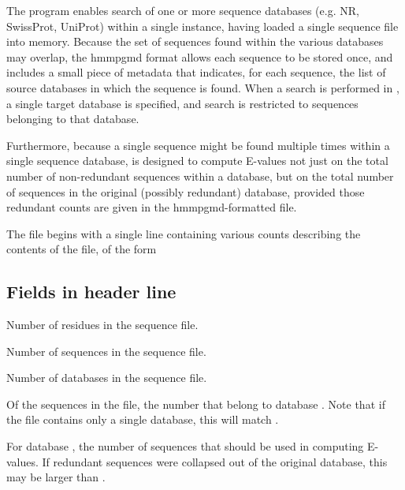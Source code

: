 The  program enables search of one or more sequence 
databases (e.g. NR, SwissProt, UniProt) within a single instance,
having loaded a single sequence file into memory. Because the set of 
sequences found within the various databases may overlap, the hmmpgmd 
format allows each sequence to be stored once, and includes a small piece of
metadata that indicates, for each sequence, the list of source databases in
which the sequence is found. When a search is performed in , a
single target database is specified, and search is restricted to sequences
belonging to that database.

Furthermore, because a single sequence might be found multiple times
within a single sequence database,  is designed to compute
E-values not just on the total number of non-redundant sequences
within a database, but on the total number of sequences in the original
(possibly redundant) database, provided those redundant counts are
given in the hmmpgmd-formatted file.

The  file begins with a single line containing various counts
describing the contents of the file, of the form


\subsection{Fields in header line}

\begin{sreitems}{}

\item [\monob{res\_cnt}] Number of residues in the sequence file.

\item [\monob{seq\_cnt}] Number of sequences in the sequence file. 

\item [\monob{db\_cnt}] Number of databases in the sequence file. 

\item [\monob{cnt\_i}] Of the sequences in the file, the number that belong to
database . Note that if the file contains only a single
database, this will match .
 
\item [\monob{fullcnt\_i}] For database , the number of sequences
that should be used in computing E-values. If redundant 
sequences were collapsed out of the original database, this may be 
larger than .  

\end{sreitems}



